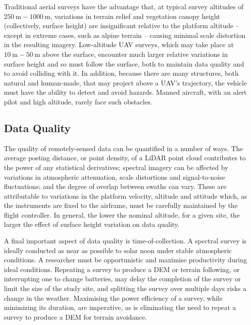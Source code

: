 \documentclass[doc]{apa6}
\begin{document}
Traditional aerial surveys have the advantage that, at typical survey altitudes of $\SI{250}\m-\SI{1000}\m$, variations in terrain relief and vegetation canopy height (collectively, surface height) are insignificant relative to the platform altitude -- except in extreme cases, such as alpine terrain -- causing minimal scale distortion in the resulting imagery. Low-altitude UAV surveys, which may take place at $\SI{10}\m-\SI{50}\m$ above the surface, encounter much larger relative variations in surface height and so must follow the surface, both to maintain data quality and to avoid colliding with it. In addition, because there are many structures, both natural and human-made, that may project above a UAV's trajectory, the vehicle must have the ability to detect and avoid hazards. Manned aircraft, with an alert pilot and high altitude, rarely face such obstacles. 


\subsection{Data Quality}

The quality of remotely-sensed data can be quantified in a number of ways. The average posting distance, or point density, of a LiDAR point cloud contributes to the power of any statistical derivatives; spectral imagery can be affected by variations in atmospheric attenuation, scale distortions and signal-to-noise fluctuations; and the degree of overlap between swaths can vary. These are attributable to variations in the platform velocity, altitude and attitude which, as the instruments are fixed to the airframe, must be carefully maintained by the flight controller. In general, the lower the nominal altitude, for a given site, the larger the effect of surface height variation on data quality.

A final important aspect of data quality is time-of-collection. A spectral survey is ideally conducted as near as possible to solar noon under stable atmospheric conditions. A researcher must be opportunistic and maximise productivity during ideal conditions. Repeating a survey to produce a DEM or terrain following, or interrupting one to change batteries, may delay the completion of the survey or limit the size of the study site, and splitting the survey over multiple days risks a change in the weather. Maximising the power efficiency of a survey, while minimizing its duration, are imperative, as is eliminating the need to repeat a survey to produce a DEM for terrain avoidance.
\end{document}

